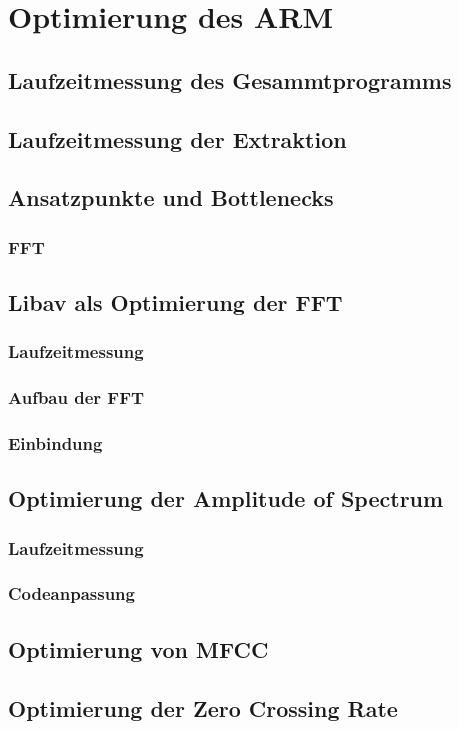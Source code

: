 
\section{Optimierung des ARM}

\subsection{Laufzeitmessung des Gesammtprogramms}

\subsection{Laufzeitmessung der Extraktion}

\subsection{Ansatzpunkte und Bottlenecks}\label{sec:ansatz}


\subsubsection{FFT}


\subsection{Libav als Optimierung der FFT}\label{subsec:optFFT}
\subsubsection{Laufzeitmessung}
\subsubsection{Aufbau der FFT}
\subsubsection{Einbindung}

\subsection{Optimierung der Amplitude of Spectrum}\label{subsec:optAOS}
\subsubsection{Laufzeitmessung}
\subsubsection{Codeanpassung}

\subsection{Optimierung von MFCC}

\subsection{Optimierung der Zero Crossing Rate}



 
